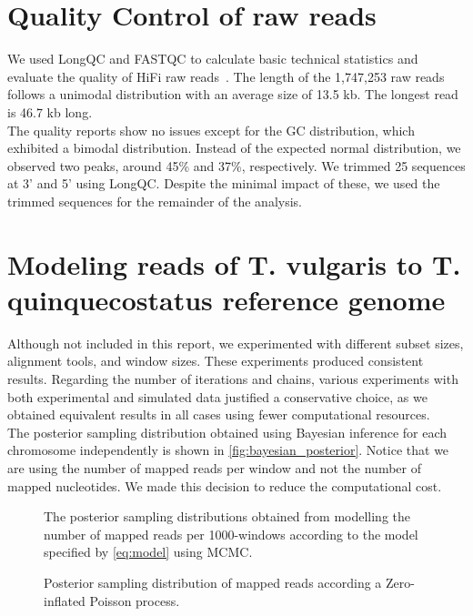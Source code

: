 \section{Quality Control of raw reads}

We used LongQC and FASTQC to calculate basic technical statistics and evaluate the quality of \ac{HiFi} raw reads~\cite{fukasawaLongQCQualityControl2020,BabrahamBioinformaticsFastQC}. The length of the 1,747,253 raw reads follows a unimodal distribution with an average size of 13.5 kb. The longest read is 46.7 kb long. \\

The quality reports show no issues except for the GC distribution, which exhibited a bimodal distribution. Instead of the expected normal distribution, we observed two peaks, around 45\%  and 37\%, respectively. We trimmed 25 sequences at 3' and 5' using LongQC. Despite the minimal impact of these, we used the trimmed sequences for the remainder of the analysis. \\

\section{Modeling reads of T. vulgaris to T. quinquecostatus reference genome}

Although not included in this report, we experimented with different subset sizes, alignment tools, and window sizes. These experiments produced consistent results. Regarding the number of iterations and chains, various experiments with both experimental and simulated data justified a conservative choice, as we obtained equivalent results in all cases using fewer computational resources. \\

The posterior sampling distribution obtained using Bayesian inference for each chromosome independently is shown in \autoref{fig:bayesian_posterior}. Notice that we are using the number of mapped reads per window and not the number of mapped nucleotides. We made this decision to reduce the computational cost. \\

\graphicspath{{gfx/}}
\begin{figure}
\centering

\caption{Posterior sampling distribution of mapped reads according a Zero-inflated Poisson process.}
\small
    The posterior sampling distributions obtained from modelling the number of mapped reads per 1000-windows according to the model specified by \eqref{eq:model} using \ac{MCMC}.   
\label{fig:bayesian_posterior}
\end{figure}    

